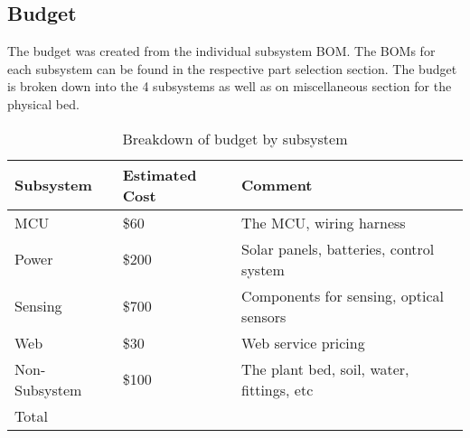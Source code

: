 \subsection{Budget}
The budget was created from the individual subsystem BOM. The BOMs for each subsystem can be found in the respective part selection section. The budget is broken down into the 4 subsystems as well as on miscellaneous section for the physical bed. 
\begin{table}[H]
    \centering
    \begin{tabularx}{.8\textwidth}
        {
            | >{\raggedright\arraybackslash}X
            | >{\raggedright\arraybackslash}X
            | >{\raggedleft\arraybackslash}X
            |
        }
        \caption{Breakdown of budget by subsystem}\\
        \hline
        Subsystem & Estimated Cost & Comment \\
        \hline
        MCU & \$60 & The MCU, wiring harness \\         %
        \hline
        Power & \$200 & Solar panels, batteries, control system \\
        \hline
        Sensing & \$700 & Components for sensing, optical sensors \\ %
        \hline
        Web & \$30 & Web service pricing \\             %
        \hline
        Non-Subsystem & \$100 & The plant bed, soil, water, fittings, etc \\
        \hline
        Total & \multicolumn{2}{|c|}{\$1090}\\           %
        \hline
    \end{tabularx}
\end{table}

